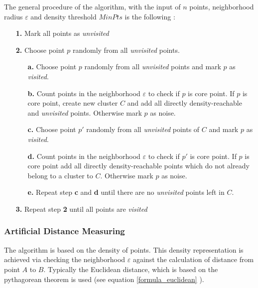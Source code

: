 The general procedure of the algorithm, with the input of $n$ points, neighborhood radius $\varepsilon$ and density threshold $MinPts$ is the following \parencite{Zhao2018}:

\begin{itemize}
	\item[\textbf{1.}] Mark all points as \textit{unvisited}
	\item[\textbf{2.}] Choose point $p$ randomly from all \textit{unvisited} points.
	\begin{itemize}
		\item[\textbf{a.}] Choose point $p$ randomly from all \textit{unvisited} points and mark $p$ as \textit{visited}.
		\item[\textbf{b.}] Count points in the neighborhood $\varepsilon$ to check if $p$ is core point. If $p$ is core point, create new cluster $C$ and add all directly density-reachable and \textit{unvisited} points. Otherwise mark $p$ as noise.
		\item[\textbf{c.}] Choose point $p'$ randomly from all \textit{unvisited} points of $C$ and mark $p$ as \textit{visited}.
		\item[\textbf{d.}] Count points in the neighborhood $\varepsilon$ to check if $p'$ is core point. If $p$ is core point add all directly density-reachable points which do not already belong to a cluster to $C$. Otherwise mark $p$ as noise.
		\item[\textbf{e.}] Repeat step \textbf{c} and \textbf{d} until there are no \textit{unvisited} points left in $C$.	
	\end{itemize} 
	\item[\textbf{3.}] Repeat step \textbf{2} until all points are \textit{visited} 
\end{itemize}

\subsubsection{Artificial Distance Measuring}
The algorithm is based on the density of points. This density representation is achieved via checking the neighborhood $\varepsilon$ against the calculation of distance from point $A$ to $B$. Typically the Euclidean distance, which is based on the pythagorean theorem is used (see equation \ref{formula_euclidean} \parencite{Erhard2020}).

